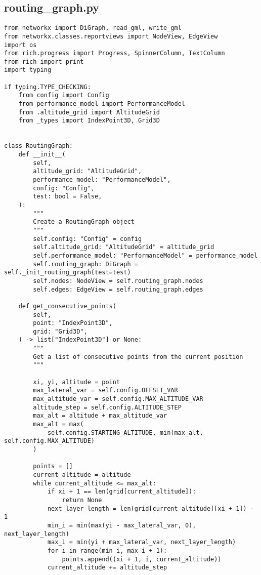 \subsection{routing_graph.py}
\begin{verbatim}
from networkx import DiGraph, read_gml, write_gml
from networkx.classes.reportviews import NodeView, EdgeView
import os
from rich.progress import Progress, SpinnerColumn, TextColumn
from rich import print
import typing

if typing.TYPE_CHECKING:
    from config import Config
    from performance_model import PerformanceModel
    from .altitude_grid import AltitudeGrid
    from _types import IndexPoint3D, Grid3D


class RoutingGraph:
    def __init__(
        self,
        altitude_grid: "AltitudeGrid",
        performance_model: "PerformanceModel",
        config: "Config",
        test: bool = False,
    ):
        """
        Create a RoutingGraph object
        """
        self.config: "Config" = config
        self.altitude_grid: "AltitudeGrid" = altitude_grid
        self.performance_model: "PerformanceModel" = performance_model
        self.routing_graph: DiGraph = self._init_routing_graph(test=test)
        self.nodes: NodeView = self.routing_graph.nodes
        self.edges: EdgeView = self.routing_graph.edges

    def get_consecutive_points(
        self,
        point: "IndexPoint3D",
        grid: "Grid3D",
    ) -> list["IndexPoint3D"] or None:
        """
        Get a list of consecutive points from the current position
        """

        xi, yi, altitude = point
        max_lateral_var = self.config.OFFSET_VAR
        max_altitude_var = self.config.MAX_ALTITUDE_VAR
        altitude_step = self.config.ALTITUDE_STEP
        max_alt = altitude + max_altitude_var
        max_alt = max(
            self.config.STARTING_ALTITUDE, min(max_alt, self.config.MAX_ALTITUDE)
        )

        points = []
        current_altitude = altitude
        while current_altitude <= max_alt:
            if xi + 1 == len(grid[current_altitude]):
                return None
            next_layer_length = len(grid[current_altitude][xi + 1]) - 1
            min_i = min(max(yi - max_lateral_var, 0), next_layer_length)
            max_i = min(yi + max_lateral_var, next_layer_length)
            for i in range(min_i, max_i + 1):
                points.append((xi + 1, i, current_altitude))
            current_altitude += altitude_step


\end{verbatim}
